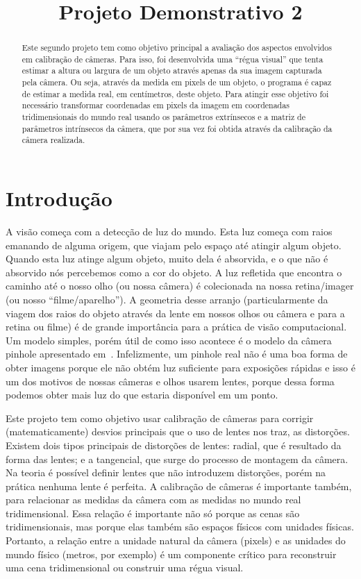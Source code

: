 \documentclass{bmvc2k}
\title{Projeto Demonstrativo 2}
\begin{document}
\maketitle

\begin{abstract}
Este segundo projeto tem como objetivo principal a avaliação dos aspectos envolvidos em calibração de câmeras. Para isso, foi desenvolvida uma ``régua visual'' que tenta estimar a altura ou largura de um objeto através apenas da sua imagem capturada pela câmera. Ou seja, através da medida em pixels de um objeto, o programa é capaz de estimar a medida real, em centímetros, deste objeto. Para atingir esse objetivo foi necessário transformar coordenadas em pixels da imagem em coordenadas tridimensionais do mundo real usando os parâmetros extrínsecos e a matriz de parâmetros intrínsecos da câmera, que por sua vez foi obtida através da calibração da câmera realizada.
\end{abstract}

\section{Introdução}
\label{sec:intro}
A visão começa com a detecção de luz do mundo. Esta luz começa com raios emanando de alguma origem, que viajam pelo espaço até atingir algum objeto. Quando esta luz atinge algum objeto, muito dela é absorvida, e o que não é absorvido nós percebemos como a cor do objeto. A luz refletida que encontra o caminho até o nosso olho (ou nossa câmera) é colecionada na nossa retina/imager (ou nosso ``filme/aparelho''). A geometria desse arranjo (particularmente da viagem dos raios do objeto através da lente em nossos olhos ou câmera e para a retina ou filme) é de grande importância para a prática de visão computacional. Um modelo simples, porém útil de como isso acontece é o modelo da câmera pinhole apresentado em~\cite{Hartley}. Infelizmente, um pinhole real não é uma boa forma de obter imagens porque ele não obtém luz suficiente para exposições rápidas e isso é um dos motivos de nossas câmeras e olhos usarem lentes, porque dessa forma podemos obter mais luz do que estaria disponível em um ponto.

Este projeto tem como objetivo usar calibração de câmeras para corrigir (matematicamente) desvios principais que o uso de lentes nos traz, as distorções. Existem dois tipos principais de distorções de lentes: radial, que é resultado da forma das lentes; e a tangencial, que surge do processo de montagem da câmera. Na teoria é possível definir lentes que não introduzem distorções, porém na prática nenhuma lente é perfeita. A calibração de câmeras é importante também, para relacionar as medidas da câmera com as medidas no mundo real tridimensional. Essa relação é importante não só porque as cenas são tridimensionais, mas porque elas também são espaços físicos com unidades físicas. Portanto, a relação entre a unidade natural da câmera (pixels) e as unidades do mundo físico (metros, por exemplo) é um componente crítico para reconstruir uma cena tridimensional ou construir uma régua visual.
\end{document}
